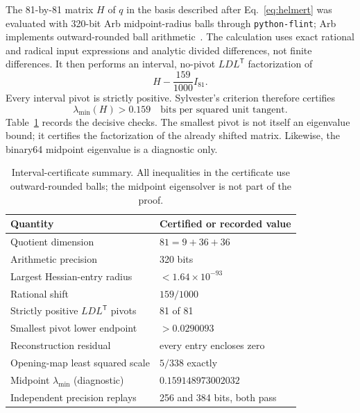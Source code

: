 \documentclass[11pt]{article}
\begin{document}
The 81-by-81 matrix $H$ of $q$ in the basis described after
Eq.~\eqref{eq:helmert} was evaluated with 320-bit Arb midpoint-radius balls
through \texttt{python-flint}; Arb implements outward-rounded ball
arithmetic~\cite{Johansson2017}.  The calculation uses exact rational and
radical input expressions and analytic divided differences, not finite
differences.  It then performs an interval, no-pivot $LDL^{\mathsf T}$
factorization of
\begin{equation}
 H-\frac{159}{1000}I_{81}.
 \label{eq:shift}
\end{equation}
Every interval pivot is strictly positive.  Sylvester's criterion therefore
certifies
\begin{equation}
 \boxed{\lambda_{\min}(H)>0.159}
 \quad\text{bits per squared unit tangent.}
 \label{eq:hessian-gap}
\end{equation}
Table~\ref{tab:certificate} records the decisive checks.  The smallest pivot
is not itself an eigenvalue bound; it certifies the factorization of the
already shifted matrix.  Likewise, the binary64 midpoint eigenvalue is a
diagnostic only.

\begin{table}[t]
\centering
\caption{Interval-certificate summary.  All inequalities in the certificate
use outward-rounded balls; the midpoint eigensolver is not part of the proof.}
\label{tab:certificate}
\begin{tabular}{@{}ll@{}}
\toprule
Quantity & Certified or recorded value \\
\midrule
Quotient dimension & $81=9+36+36$ \\
Arithmetic precision & 320 bits \\
Largest Hessian-entry radius & $<1.64\times10^{-93}$ \\
Rational shift & $159/1000$ \\
Strictly positive $LDL^{\mathsf T}$ pivots & 81 of 81 \\
Smallest pivot lower endpoint & $>0.0290093$ \\
Reconstruction residual & every entry encloses zero \\
Opening-map least squared scale & $5/338$ exactly \\
Midpoint $\lambda_{\min}$ (diagnostic) & $0.159148973002032$ \\
Independent precision replays & 256 and 384 bits, both pass \\
\bottomrule
\end{tabular}
\end{table}
\end{document}
